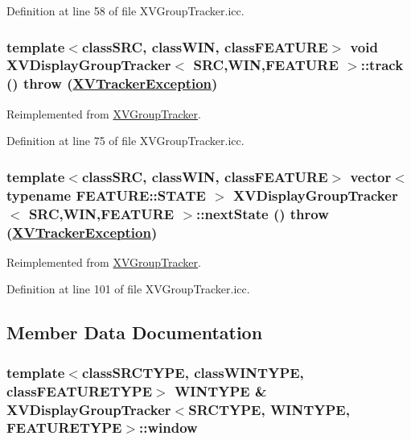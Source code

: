 Definition at line 58 of file XVGroup\-Tracker.icc.\label{XVDisplayGroupTracker_a3}
\hypertarget{class_XVDisplayGroupTracker_a3}{
\subsubsection[track]{\setlength{\rightskip}{0pt plus 5cm}template$<$classSRC, classWIN, classFEATURE$>$ void XVDisplay\-Group\-Tracker$<$ SRC,WIN,FEATURE $>$::track ()  throw (\hyperlink{class_XVTrackerException}{XVTracker\-Exception})}}




Reimplemented from \hyperlink{class_XVGroupTracker}{XVGroup\-Tracker}.

Definition at line 75 of file XVGroup\-Tracker.icc.\label{XVDisplayGroupTracker_a4}
\hypertarget{class_XVDisplayGroupTracker_a4}{
\subsubsection[nextState]{\setlength{\rightskip}{0pt plus 5cm}template$<$classSRC, classWIN, classFEATURE$>$ vector$<$ typename FEATURE::STATE $>$ XVDisplay\-Group\-Tracker$<$ SRC,WIN,FEATURE $>$::next\-State ()  throw (\hyperlink{class_XVTrackerException}{XVTracker\-Exception})}}




Reimplemented from \hyperlink{class_XVGroupTracker}{XVGroup\-Tracker}.

Definition at line 101 of file XVGroup\-Tracker.icc.

\subsection{Member Data Documentation}
\label{XVDisplayGroupTracker_n0}
\hypertarget{class_XVDisplayGroupTracker_n0}{
\subsubsection[window]{\setlength{\rightskip}{0pt plus 5cm}template$<$classSRCTYPE, classWINTYPE, classFEATURETYPE$>$ WINTYPE \& XVDisplay\-Group\-Tracker$<$SRCTYPE, WINTYPE, FEATURETYPE$>$::window}}




